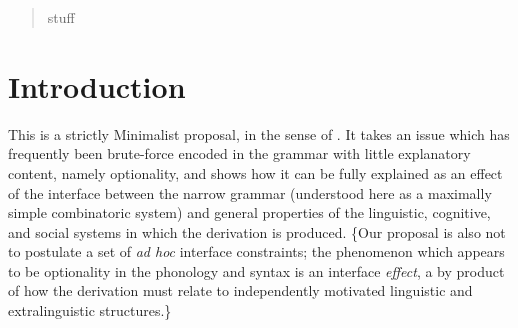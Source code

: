 \author{Josef Fruewald \& Joel C. Wallenberg}



\date{Received: date / Accepted: date}


\maketitle

\begin{abstract}
stuff
\end{abstract}

\section{Introduction}
\label{intro}

This is a strictly Minimalist proposal, in the sense of \citet{chomsky1993, chomsky1995, chomsky1998,chomsky2001}.
It takes an issue which has frequently been brute-force encoded in the grammar with little explanatory content, namely optionality, and shows how it can be fully explained as an effect of the interface between the narrow grammar (understood here as a maximally simple combinatoric system) and general properties of the linguistic, cognitive, and social systems in which the derivation is produced.
\{Our proposal is also not to postulate a set of \textsl{ad hoc} interface constraints; the phenomenon which appears to be optionality in the phonology and syntax is an interface \textsl{effect}, a by product of how the derivation must relate to independently motivated linguistic and extralinguistic structures.\}

